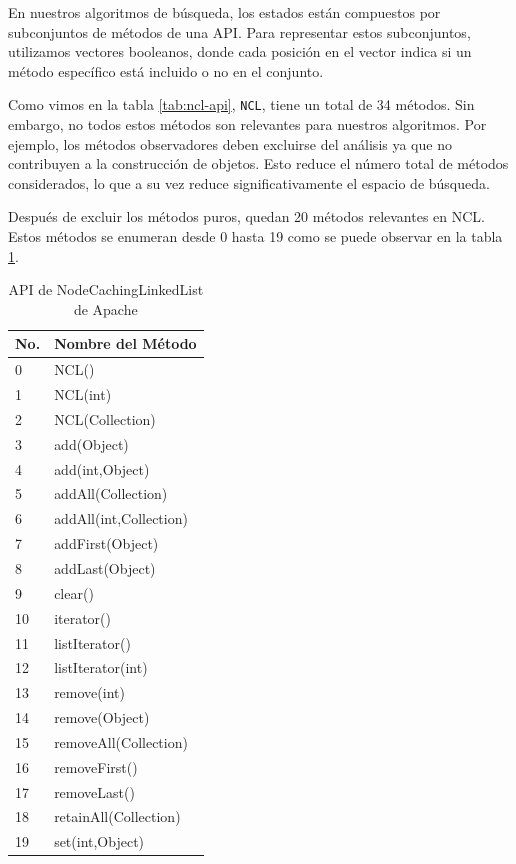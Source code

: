 En nuestros algoritmos de búsqueda, los estados están compuestos por subconjuntos de métodos de una API. Para representar estos subconjuntos, utilizamos vectores booleanos, donde cada posición en el vector indica si un método específico está incluido o no en el conjunto.

Como vimos en la tabla \ref{tab:ncl-api}, \texttt{NCL}, tiene un total de 34 métodos. Sin embargo, no todos estos métodos son relevantes para nuestros algoritmos. Por ejemplo, los métodos observadores deben excluirse del análisis ya que no contribuyen a la construcción de objetos. Esto reduce el número total de métodos considerados, lo que a su vez reduce significativamente el espacio de búsqueda.

Después de excluir los métodos puros, quedan 20 métodos relevantes en NCL. Estos métodos se enumeran desde 0 hasta 19 como se puede observar en la tabla \ref{tab:ncl-api-infer}. 
\begin{table}[h!]
\centering
{\scriptsize
\begin{tabular}{|l|l|}
\hline
No. & Nombre del Método \\
\hline
0 & NCL() \\
1 & NCL(int) \\
2 & NCL(Collection) \\
3 & add(Object) \\
4 & add(int,Object) \\
5 & addAll(Collection) \\
6 & addAll(int,Collection) \\
7 & addFirst(Object) \\
8 & addLast(Object) \\
9 & clear() \\
10 & iterator() \\
11 & listIterator() \\
12 & listIterator(int) \\
13 & remove(int) \\
14 & remove(Object) \\
15 & removeAll(Collection) \\
16 & removeFirst() \\
17 & removeLast() \\
18 & retainAll(Collection) \\
19 & set(int,Object) \\
\hline
\end{tabular}
}
\caption{API de NodeCachingLinkedList de Apache}
\label{tab:ncl-api-infer}
\end{table}

